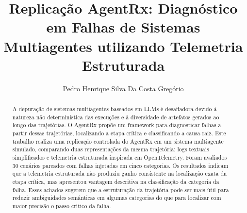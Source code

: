 \documentclass[sigconf]{acmart}
\begin{document}
\title{Replicação AgentRx: Diagnóstico em Falhas de Sistemas Multiagentes utilizando Telemetria Estruturada}

\author{Pedro Henrique Silva Da Costa Gregório}

\begin{abstract}

	A depuração de sistemas multiagentes baseados em LLMs é desafiadora devido à natureza não determinística das execuções
	e à diversidade de artefatos gerados ao longo das trajetórias. O AgentRx propõe um framework para diagnosticar falhas a
	partir dessas trajetórias, localizando a etapa crítica e classificando a causa raiz. Este trabalho realiza uma
	replicação controlada do AgentRx em um sistema multiagente simulado, comparando duas representações da mesma
	trajetória: logs textuais simplificados e telemetria estruturada inspirada em OpenTelemetry. Foram avaliados 30
	cenários pareados com falhas injetadas em cinco categorias. Os resultados indicam que a telemetria estruturada não
	produziu ganho consistente na localização exata da etapa crítica, mas apresentou vantagem descritiva na classificação
	da categoria da falha. Esses achados sugerem que a estruturação da trajetória pode ser mais útil para reduzir
	ambiguidades semânticas em algumas categorias do que para localizar com maior precisão o passo crítico da falha.
\end{abstract}

\end{document}
